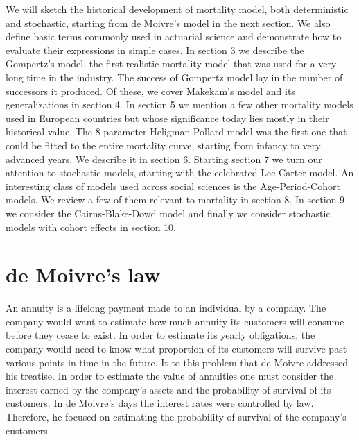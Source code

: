 \documentclass{article}
\numberwithin{equation}{section}
\begin{document}
We will sketch the historical development of mortality model, both 
deterministic and stochastic, starting from de Moivre's model in the next
section. We also define basic terms commonly used in actuarial science and 
demonstrate how to evaluate their expressions in simple cases. In section 3
we describe the Gompertz's model, the first realistic mortality model that 
was used for a very long time in the industry. The success of Gompertz model
lay in the number of successors it produced. Of these, we cover Makekam's 
model and its generalizations in section 4. In section 5 we mention a few
other mortality models used in European countries but whose significance today
lies mostly in their historical value. The $8$-parameter Heligman-Pollard model
was the first one that could be fitted to the entire mortality curve, starting
from infancy to very advanced years. We describe it in section 6. Starting
section 7 we turn our attention to stochastic models, starting with the
celebrated Lee-Carter model. An interesting class of models used across social
sciences is the Age-Period-Cohort models. We review a few of them relevant
to mortality in section 8. In section 9 we consider the Cairns-Blake-Dowd model
and finally we consider stochastic models with cohort effects in section 10.

\section{de Moivre's law}\label{s1}
An annuity is a lifelong payment made to an individual by a company. The 
company would want to estimate how much annuity its customers will consume
before they cease to exist. In order to estimate its yearly obligations, the
company would need to know what proportion of its customers will survive
past various points in time in the future. It to this problem that de Moivre 
\cite{de1731annuities} addressed his treatise. In order to estimate the value
of annuities one must consider the interest earned by the company's assets and
the probability of survival of its customers. In de Moivre's days the interest
rates were controlled by law. Therefore, he focused on estimating the 
probability of survival of the company's customers.
\end{document}
